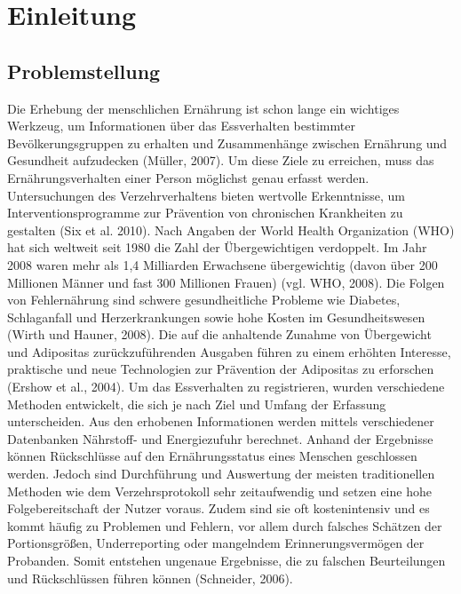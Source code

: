 
\section{Einleitung}

\subsection{Problemstellung}
Die Erhebung der menschlichen  Ernährung ist schon lange ein wichtiges Werkzeug, um Informationen über das Essverhalten bestimmter Bevölkerungsgruppen zu erhalten und Zusammenhänge zwischen Ernährung und Gesundheit aufzudecken (Müller, 2007).
Um diese Ziele zu erreichen, muss das Ernährungsverhalten einer Person möglichst genau erfasst werden. Untersuchungen des Verzehrverhaltens bieten wertvolle Erkenntnisse, um Interventionsprogramme zur Prävention von chronischen Krankheiten zu gestalten (Six et al. 2010). Nach  Angaben der World Health Organization (WHO) hat sich weltweit seit 1980 die Zahl der Übergewichtigen verdoppelt. Im Jahr 2008 waren mehr als 1,4 Milliarden Erwachsene übergewichtig (davon über 200 Millionen Männer und fast 300 Millionen Frauen) (vgl. WHO, 2008). Die Folgen von Fehlernährung sind schwere gesundheitliche Probleme wie Diabetes, Schlaganfall und Herzerkrankungen sowie hohe Kosten im Gesundheitswesen (Wirth und Hauner, 2008). Die auf die anhaltende Zunahme von Übergewicht und Adipositas zurückzuführenden Ausgaben führen zu einem erhöhten Interesse, praktische und neue Technologien zur Prävention der Adipositas zu erforschen (Ershow et al., 2004). Um das Essverhalten zu registrieren, wurden verschiedene Methoden entwickelt, die sich je nach Ziel und Umfang der Erfassung unterscheiden. Aus den erhobenen Informationen werden mittels verschiedener Datenbanken Nährstoff- und Energiezufuhr berechnet. Anhand der Ergebnisse können Rückschlüsse auf den Ernährungsstatus eines Menschen geschlossen werden. Jedoch sind Durchführung und Auswertung der meisten traditionellen Methoden wie dem Verzehrsprotokoll sehr zeitaufwendig und setzen eine hohe Folgebereitschaft der Nutzer voraus. Zudem sind sie oft kostenintensiv und es kommt häufig zu Problemen und Fehlern, vor allem durch falsches Schätzen der Portionsgrößen, Underreporting oder mangelndem Erinnerungsvermögen der Probanden. Somit entstehen ungenaue Ergebnisse, die zu falschen Beurteilungen und Rückschlüssen führen können (Schneider, 2006).


